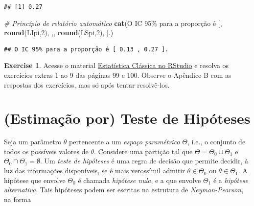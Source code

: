 \documentclass[
]{book}
\newenvironment{Shaded}{\begin{snugshade}}{\end{snugshade}}
\newcommand{\CommentTok}[1]{\textcolor[rgb]{0.56,0.35,0.01}{\textit{#1}}}
\newcommand{\DecValTok}[1]{\textcolor[rgb]{0.00,0.00,0.81}{#1}}
\newcommand{\KeywordTok}[1]{\textcolor[rgb]{0.13,0.29,0.53}{\textbf{#1}}}
\newcommand{\NormalTok}[1]{#1}
\newcommand{\StringTok}[1]{\textcolor[rgb]{0.31,0.60,0.02}{#1}}
\theoremstyle{definition}
\theoremstyle{definition}
\theoremstyle{definition}
\newtheorem{exercise}{Exercise}[chapter]
\theoremstyle{remark}
\begin{document}
\begin{verbatim}
## [1] 0.27
\end{verbatim}

\begin{Shaded}
\begin{Highlighting}[]
\CommentTok{\# Princípio de relatório automático}
\KeywordTok{cat}\NormalTok{(}\StringTok{\textquotesingle{}O IC 95\% para a proporção é [\textquotesingle{}}\NormalTok{, }
    \KeywordTok{round}\NormalTok{(LIpi,}\DecValTok{2}\NormalTok{), }\StringTok{\textquotesingle{},\textquotesingle{}}\NormalTok{, }
    \KeywordTok{round}\NormalTok{(LSpi,}\DecValTok{2}\NormalTok{), }\StringTok{\textquotesingle{}].\textquotesingle{}}\NormalTok{)}
\end{Highlighting}
\end{Shaded}

\begin{verbatim}
## O IC 95% para a proporção é [ 0.13 , 0.27 ].
\end{verbatim}

\begin{exercise}
\protect\hypertarget{exr:unnamed-chunk-92}{}{\label{exr:unnamed-chunk-92} }Acesse o material \href{http://www.filipezabala.com/materiais/ecnrs.pdf}{Estatística Clássica no RStudio} e resolva os exercícios extras 1 ao 9 das páginas 99 e 100. Observe o Apêndice B com as respostas dos exercícios, mas só após tentar resolvê-los.
\end{exercise}

\hypertarget{estimauxe7uxe3o-por-teste-de-hipuxf3teses}{%
\section{(Estimação por) Teste de Hipóteses}\label{estimauxe7uxe3o-por-teste-de-hipuxf3teses}}

Seja um parâmetro \(\theta\) pertencente a um \emph{espaço paramétrico} \(\Theta\), i.e., o conjunto de todos os possíveis valores de \(\theta\). Considere uma partição tal que \(\Theta = \Theta_0 \cup \Theta_1\) e \(\Theta_0 \cap \Theta_1 = \emptyset\). Um \emph{teste de hipóteses} é uma regra de decisão que permite decidir, à luz das informações disponíveis, se é mais verossímil admitir \(\theta \in \Theta_0\) ou \(\theta \in \Theta_1\). A hipótese que envolve \(\Theta_0\) é chamada \emph{hipótese nula}, e a que envolve \(\Theta_1\) é a \emph{hipótese alternativa}. Tais hipóteses podem ser escritas na estrutura de \emph{Neyman-Pearson}, na forma
\end{document}
